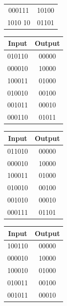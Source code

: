 \begin{table}
\begin{subtable}[h]{0.10\textwidth}
\begin{tabular}{cc}
		000111	&	10100\\
		1010	10	&	01101\\
		\end{tabular}
		\bigskip
		\label{table:trainingexplanations:one}
	\end{subtable}
	\hspace{3.75cm}
	\begin{subtable}[h]{0.10\textwidth}
		\centering
		\begin{tabular}{cc}
		Input & Output \\
		\hline
		010110	&	00000\\
		000010	&	10000\\
		100011	&	01000\\
		010010	&	00100\\
		001011	&	00010\\
		000110	&	01011\\
		\end{tabular}
		\bigskip
		\label{table:trainingexplanations:one}
	\end{subtable}
	\newline
	\begin{subtable}[h]{0.10\textwidth}
		\centering
		\begin{tabular}{cc}
		Input & Output \\
		\hline
		011010	&	00000\\
		000010	&	10000\\
		100011	&	01000\\
		010010	&	00100\\
		001010	&	00010\\
		000111	&	01101\\
		\end{tabular}
		\bigskip
		\label{table:trainingexplanations:one}
	\end{subtable}
		\hspace{3.75cm}
		\begin{subtable}[h]{0.10\textwidth}
		\centering
		\begin{tabular}{cc}
		Input & Output \\
		\hline
		100110	&	00000\\
		000010	&	10000\\
		100010	&	01000\\
		010011	&	00100\\
		001011	&	00010\\

\end{tabular}
\end{subtable}
\end{table}
